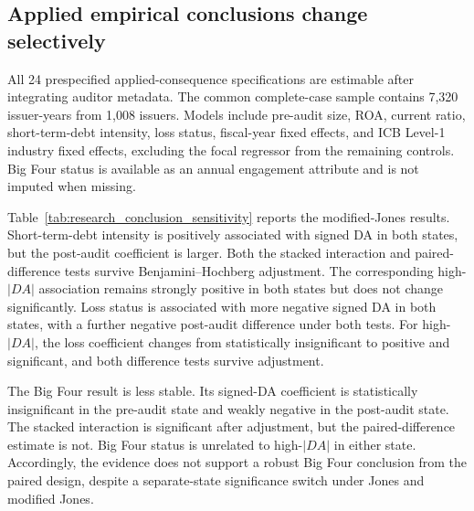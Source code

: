\subsection{Applied empirical conclusions change selectively}\label{subsec:results_conclusion_sensitivity}

All 24 prespecified applied-consequence specifications are estimable after integrating auditor metadata. The common complete-case sample contains 7,320 issuer-years from 1,008 issuers. Models include pre-audit size, ROA, current ratio, short-term-debt intensity, loss status, fiscal-year fixed effects, and ICB Level-1 industry fixed effects, excluding the focal regressor from the remaining controls. Big Four status is available as an annual engagement attribute and is not imputed when missing.

Table~\ref{tab:research_conclusion_sensitivity} reports the modified-Jones results. Short-term-debt intensity is positively associated with signed DA in both states, but the post-audit coefficient is larger. Both the stacked interaction and paired-difference tests survive Benjamini--Hochberg adjustment. The corresponding high-$|DA|$ association remains strongly positive in both states but does not change significantly. Loss status is associated with more negative signed DA in both states, with a further negative post-audit difference under both tests. For high-$|DA|$, the loss coefficient changes from statistically insignificant to positive and significant, and both difference tests survive adjustment.

The Big Four result is less stable. Its signed-DA coefficient is statistically insignificant in the pre-audit state and weakly negative in the post-audit state. The stacked interaction is significant after adjustment, but the paired-difference estimate is not. Big Four status is unrelated to high-$|DA|$ in either state. Accordingly, the evidence does not support a robust Big Four conclusion from the paired design, despite a separate-state significance switch under Jones and modified Jones.

